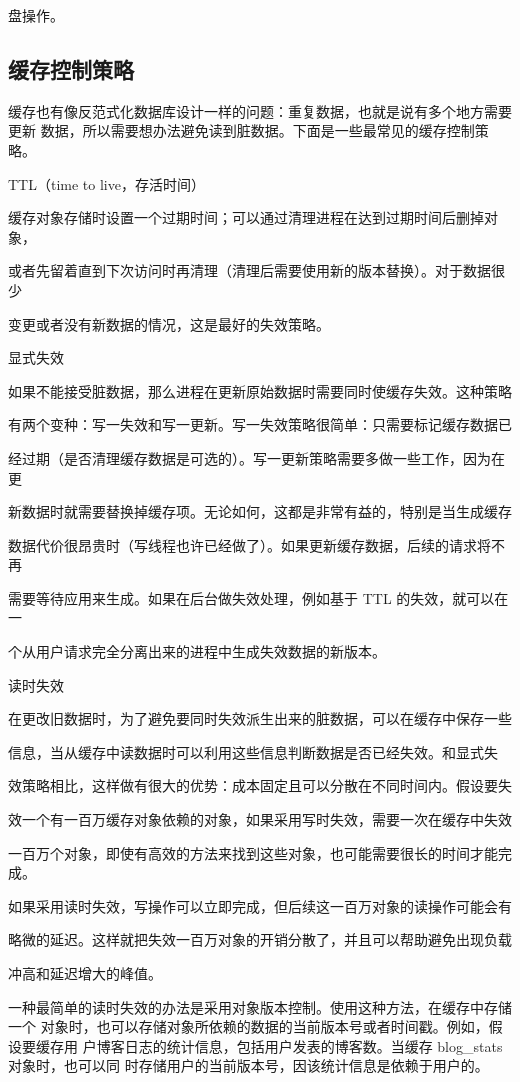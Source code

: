 盘操作。

\subsection{缓存控制策略}
缓存也有像反范式化数据库设计一样的问题：重复数据，也就是说有多个地方需要更新
数据，所以需要想办法避免读到脏数据。下面是一些最常见的缓存控制策略。

TTL（time to live，存活时间）

缓存对象存储时设置一个过期时间；可以通过清理进程在达到过期时间后删掉对象，

或者先留着直到下次访问时再清理（清理后需要使用新的版本替换）。对于数据很少

变更或者没有新数据的情况，这是最好的失效策略。

显式失效

如果不能接受脏数据，那么进程在更新原始数据时需要同时使缓存失效。这种策略

有两个变种：写一失效和写一更新。写一失效策略很简单：只需要标记缓存数据已

经过期（是否清理缓存数据是可选的）。写一更新策略需要多做一些工作，因为在更

新数据时就需要替换掉缓存项。无论如何，这都是非常有益的，特别是当生成缓存

数据代价很昂贵时（写线程也许已经做了）。如果更新缓存数据，后续的请求将不再

需要等待应用来生成。如果在后台做失效处理，例如基于 TTL 的失效，就可以在一

个从用户请求完全分离出来的进程中生成失效数据的新版本。

读时失效

在更改旧数据时，为了避免要同时失效派生出来的脏数据，可以在缓存中保存一些

信息，当从缓存中读数据时可以利用这些信息判断数据是否已经失效。和显式失

效策略相比，这样做有很大的优势：成本固定且可以分散在不同时间内。假设要失

效一个有一百万缓存对象依赖的对象，如果采用写时失效，需要一次在缓存中失效

一百万个对象，即使有高效的方法来找到这些对象，也可能需要很长的时间才能完成。

如果采用读时失效，写操作可以立即完成，但后续这一百万对象的读操作可能会有

略微的延迟。这样就把失效一百万对象的开销分散了，并且可以帮助避免出现负载

冲高和延迟增大的峰值。

一种最简单的读时失效的办法是采用对象版本控制。使用这种方法，在缓存中存储一个
对象时，也可以存储对象所依赖的数据的当前版本号或者时间戳。例如，假设要缓存用
户博客日志的统计信息，包括用户发表的博客数。当缓存 blog\_stats对象时，也可以同
时存储用户的当前版本号，因该统计信息是依赖于用户的。

